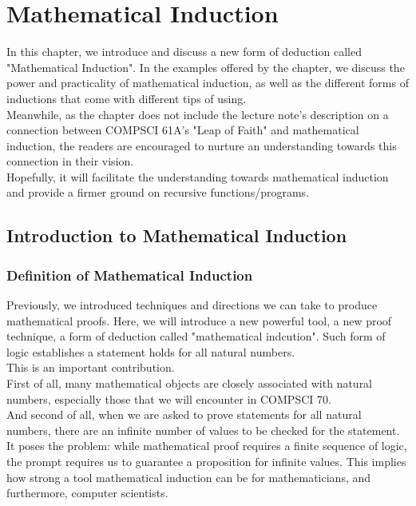 \chapter{Mathematical Induction}
In this chapter, we introduce and discuss a new form of deduction called "Mathematical Induction". In the examples offered by the chapter, we discuss the power and practicality of mathematical induction, as well as the different forms of inductions that come with different tips of using. \\
Meanwhile, as the chapter does not include the lecture note's description on a connection between COMPSCI 61A's "Leap of Faith" and mathematical induction, the readers are encouraged to nurture an understanding towards this connection in their vision. \\
Hopefully, it will facilitate the understanding towards mathematical induction and provide a firmer ground on recursive functions/programs.

\section{Introduction to Mathematical Induction}

\subsection{Definition of Mathematical Induction}
Previously, we introduced techniques and directions we can take to produce mathematical proofs. Here, we will introduce a new powerful tool, a new proof technique, a form of deduction called "mathematical indcution". Such form of logic establishes a statement holds for all natural numbers. \\
This is an important contribution. \\
First of all, many mathematical objects are closely associated with natural numbers, especially those that we will encounter in COMPSCI 70. \\
And second of all, when we are asked to prove statements for all natural numbers, there are an infinite number of values to be checked for the statement. It poses the problem: while mathematical proof requires a finite sequence of logic, the prompt requires us to guarantee a proposition for infinite values. This implies how strong a tool mathematical induction can be for mathematicians, and furthermore, computer scientists.

